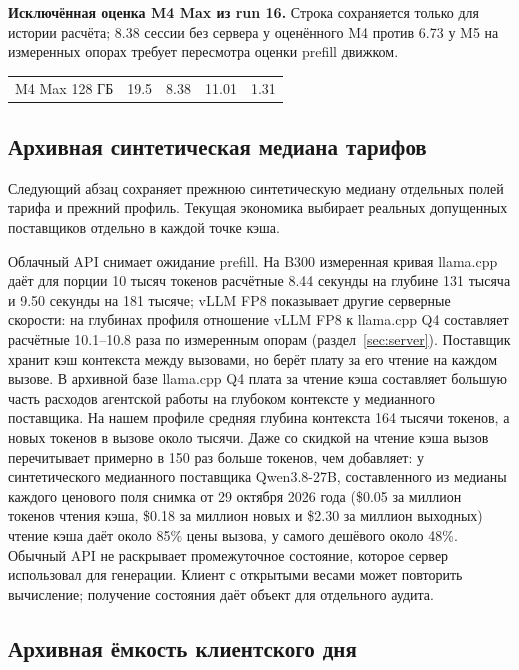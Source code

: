 \label{v5a4-m4-row}
\textbf{Исключённая оценка M4 Max из run 16.} Строка сохраняется только для истории расчёта;
8.38 сессии без сервера у оценённого M4 против 6.73 у M5 на измеренных опорах требует пересмотра оценки prefill движком.
\begin{center}\begin{tabular}{lrrrr}
M4 Max 128 ГБ & 19.5 & 8.38 & 11.01 & 1.31 \\
\end{tabular}\end{center}

\subsection{Архивная синтетическая медиана тарифов}
Следующий абзац сохраняет прежнюю синтетическую медиану отдельных полей тарифа и прежний профиль.
Текущая экономика выбирает реальных допущенных поставщиков отдельно в каждой точке кэша.

Облачный API снимает ожидание prefill. На B300 измеренная кривая llama.cpp даёт для порции
10 тысяч токенов расчётные 8.44 секунды на глубине 131 тысяча и 9.50 секунды на 181 тысяче; vLLM FP8 показывает другие
серверные скорости: на глубинах профиля отношение vLLM FP8 к llama.cpp Q4 составляет расчётные 10.1--10.8 раза по измеренным опорам (раздел~\ref{sec:server}). Поставщик
хранит кэш контекста между вызовами, но берёт плату за его чтение на каждом вызове. В архивной базе llama.cpp Q4 плата за чтение кэша составляет большую часть расходов агентской работы на глубоком контексте у медианного поставщика. На нашем профиле средняя глубина контекста 164 тысячи токенов, а новых токенов в вызове около тысячи. Даже со
скидкой на чтение кэша вызов перечитывает примерно в 150 раз больше токенов, чем добавляет: у синтетического медианного поставщика Qwen3.8-27B, составленного из медианы каждого ценового поля снимка от 29 октября 2026 года (\$0.05 за миллион токенов чтения кэша,
\$0.18 за миллион новых и \$2.30 за миллион выходных) чтение кэша даёт около 85\% цены вызова, у самого дешёвого около 48\%. Обычный API не раскрывает промежуточное состояние, которое сервер использовал для генерации.
Клиент с открытыми весами может повторить вычисление; получение состояния даёт объект для отдельного аудита.

\subsection{Архивная ёмкость клиентского дня}
\label{app:client-capacity-history}

